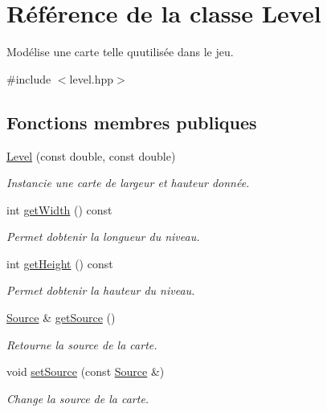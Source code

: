 \hypertarget{classLevel}{}\section{Référence de la classe Level}
\label{classLevel}


Modélise une carte telle qu\textquotesingle{}utilisée dans le jeu.  




{\ttfamily \#include $<$level.\+hpp$>$}

\subsection*{Fonctions membres publiques}
\begin{DoxyCompactItemize}
\item 
\hyperlink{classLevel_a97d9e4768c6b180d053a061fc99e66d1}{Level} (const double, const double)
\begin{DoxyCompactList}\small\item\em Instancie une carte de largeur et hauteur donnée. \end{DoxyCompactList}\item 
int \hyperlink{classLevel_a11ca1be00c88ed5c14774cf938509e61}{get\+Width} () const 
\begin{DoxyCompactList}\small\item\em Permet d\textquotesingle{}obtenir la longueur du niveau. \end{DoxyCompactList}\item 
int \hyperlink{classLevel_a0f867d54960aac1ceaa3b42fc7522924}{get\+Height} () const 
\begin{DoxyCompactList}\small\item\em Permet d\textquotesingle{}obtenir la hauteur du niveau. \end{DoxyCompactList}\item 
\hyperlink{classSource}{Source} \& \hyperlink{classLevel_a540f5c42d181bb948cf5f2c701ca3c7c}{get\+Source} ()
\begin{DoxyCompactList}\small\item\em Retourne la source de la carte. \end{DoxyCompactList}\item 
void \hyperlink{classLevel_ac867c06f1d2d3a7e5cf8ec59dd507c11}{set\+Source} (const \hyperlink{classSource}{Source} \&)
\begin{DoxyCompactList}\small\item\em Change la source de la carte. \end{DoxyCompactList}\item 

\end{DoxyCompactItemize}
